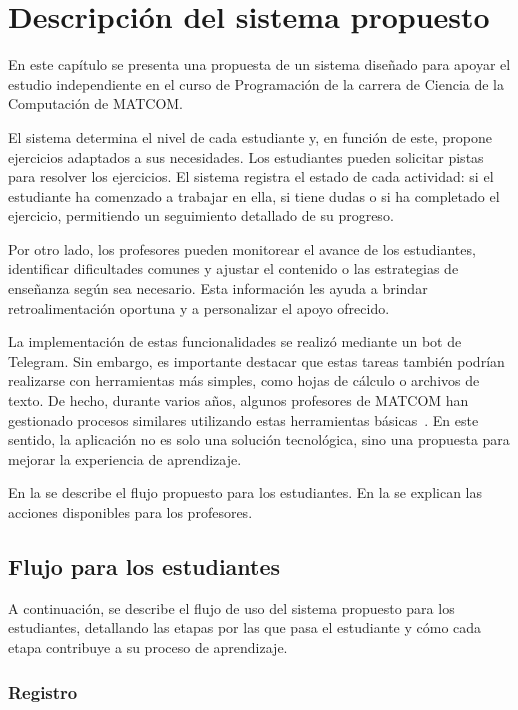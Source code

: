 \chapter{Descripción del sistema propuesto}\label{chapter:proposal}

En este capítulo se presenta una propuesta de un sistema diseñado para apoyar el estudio independiente en el curso de Programación de la carrera de Ciencia de la Computación de \mbox{MATCOM}.

El sistema determina el nivel de cada estudiante y, en función de este, propone ejercicios adaptados a sus necesidades. Los estudiantes pueden solicitar pistas para resolver los ejercicios. El sistema registra el estado de cada actividad: si el estudiante ha comenzado a trabajar en ella, si tiene dudas o si ha completado el ejercicio, permitiendo un seguimiento detallado de su progreso.

Por otro lado, los profesores pueden monitorear el avance de los estudiantes, identificar dificultades comunes y ajustar el contenido o las estrategias de enseñanza según sea necesario. Esta información les ayuda a brindar retroalimentación oportuna y a personalizar el apoyo ofrecido.

La implementación de estas funcionalidades se realizó mediante un bot de Telegram. Sin embargo, es importante destacar que estas tareas también podrían realizarse con herramientas más simples, como hojas de cálculo o archivos de texto. De hecho, durante varios años, algunos profesores de \mbox{MATCOM} han gestionado procesos similares utilizando estas herramientas básicas~\cite{rodriguez}. En este sentido, la aplicación no es solo una solución tecnológica, sino una propuesta para mejorar la experiencia de aprendizaje.

En la  se describe el flujo propuesto para los estudiantes. En la  se explican las acciones disponibles para los profesores.

\section{Flujo para los estudiantes}\label{sec:students}

A continuación, se describe el flujo de uso del sistema propuesto para los estudiantes, detallando las etapas por las que pasa el estudiante y cómo cada etapa contribuye a su proceso de aprendizaje.

\subsection{Registro}

